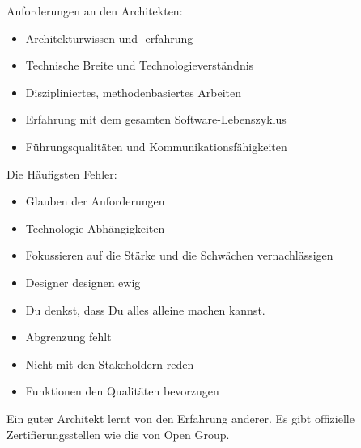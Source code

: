 Anforderungen an den Architekten:

\begin{itemize}
	\item Architekturwissen und -erfahrung
	\item Technische Breite und Technologieverständnis
	\item Diszipliniertes, methodenbasiertes Arbeiten
	\item Erfahrung mit dem gesamten Software-Lebenszyklus
	\item Führungsqualitäten und Kommunikationsfähigkeiten
\end{itemize}

Die Häufigsten Fehler:
\begin{itemize}
	\item Glauben der Anforderungen
	\item Technologie-Abhängigkeiten
	\item Fokussieren auf die Stärke und die Schwächen vernachlässigen
	\item Designer designen ewig
	\item Du denkst, dass Du alles alleine machen kannst.
	\item Abgrenzung fehlt
	\item Nicht mit den Stakeholdern reden
	\item Funktionen den Qualitäten bevorzugen
\end{itemize}

Ein guter Architekt lernt von den Erfahrung anderer. Es gibt offizielle Zertifierungsstellen wie die von Open Group.